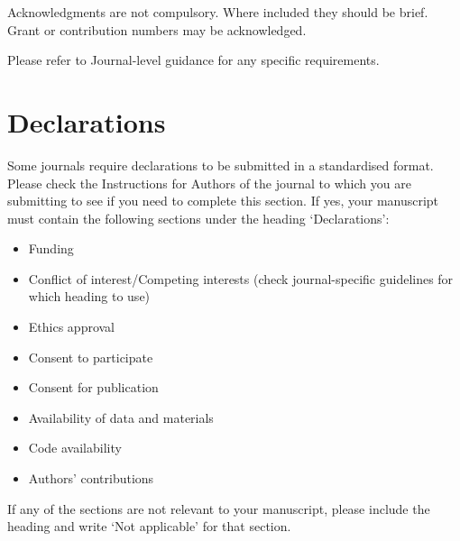 \documentclass[sn-apa,referee,pdflatex]{sn-jnl}
\providecommand{\tightlist}{%
  \setlength{\itemsep}{0pt}\setlength{\parskip}{0pt}}
\begin{document}
Acknowledgments are not compulsory. Where included they should be brief.
Grant or contribution numbers may be acknowledged.

Please refer to Journal-level guidance for any specific requirements.

\hypertarget{declarations}{%
\section*{Declarations}\label{declarations}}

Some journals require declarations to be submitted in a standardised
format. Please check the Instructions for Authors of the journal to
which you are submitting to see if you need to complete this section. If
yes, your manuscript must contain the following sections under the
heading `Declarations':

\begin{itemize}
\tightlist
\item
  Funding
\item
  Conflict of interest/Competing interests (check journal-specific
  guidelines for which heading to use)
\item
  Ethics approval
\item
  Consent to participate
\item
  Consent for publication
\item
  Availability of data and materials
\item
  Code availability
\item
  Authors' contributions
\end{itemize}

\noindent If any of the sections are not relevant to your manuscript,
please include the heading and write `Not applicable' for that section.


\end{document}
